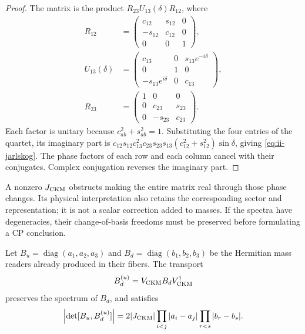 \begin{proof}
The matrix is the product \(R_{23}U_{13}(\delta)R_{12}\), where
\begin{equation}
\begin{aligned}
 R_{12}&=\begin{pmatrix}c_{12}&s_{12}&0\\-s_{12}&c_{12}&0\\0&0&1\end{pmatrix},
 \\
 U_{13}(\delta)&=
 \begin{pmatrix}c_{13}&0&s_{13}e^{-i\delta}\\0&1&0\\
 -s_{13}e^{i\delta}&0&c_{13}\end{pmatrix},
 \\
 R_{23}&=\begin{pmatrix}1&0&0\\0&c_{23}&s_{23}\\0&-s_{23}&c_{23}\end{pmatrix}.
\end{aligned}
 \label{eq:ii-ckm-factorization}
\end{equation}
Each factor is unitary because \(c_{ab}^2+s_{ab}^2=1\).
Substituting the four entries of the quartet, its imaginary part is
\(c_{12}s_{12}c_{13}^2c_{23}s_{23}s_{13}
(c_{12}^2+s_{12}^2)\sin\delta\), giving
\eqref{eq:ii-jarlskog}. The phase factors of each row and each column
cancel with their conjugates. Complex conjugation reverses the imaginary
part.
\end{proof}

A nonzero \(J_{\rm CKM}\) obstructs making the entire matrix real through
those phase changes. Its physical interpretation also retains the corresponding
sector and representation; it is not a scalar correction added
to masses. If the spectra have degeneracies, their change-of-basis
freedoms must be preserved before formulating a CP conclusion.



\begin{samepage}
\begin{proposition}
Let \(B_u=\operatorname{diag}(a_1,a_2,a_3)\) and
\(B_d=\operatorname{diag}(b_1,b_2,b_3)\) be the Hermitian mass readers
already produced in their fibers. The transport
\begin{equation}
 B_d^{(u)}=V_{\rm CKM}B_dV_{\rm CKM}^{\dagger}
 \label{eq:ii-ckm-mass-transport}
\end{equation}
preserves the spectrum of \(B_d\), and satisfies
\begin{equation}
 \left|\det[B_u,B_d^{(u)}]\right|
 =2|J_{\rm CKM}|
   \prod_{i<j}|a_i-a_j|\prod_{r<s}|b_r-b_s|.
 \label{eq:ii-ckm-commutator}
\end{equation}
\end{proposition}
\end{samepage}

